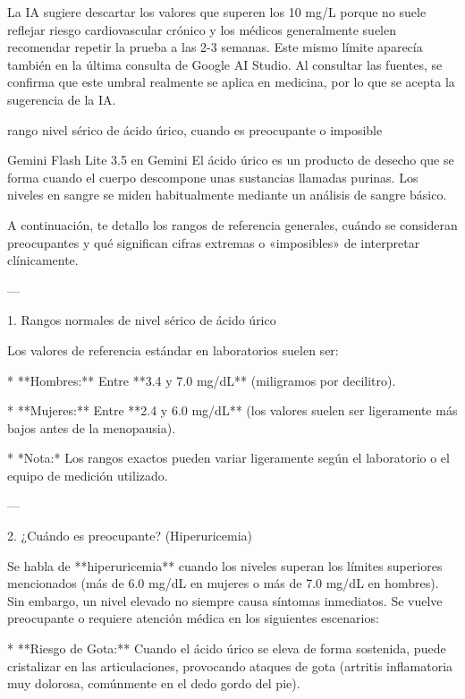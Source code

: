 \documentclass[12pt,a4paper,oneside]{book}
\begin{document}
\begin{iaanalisis}
La IA sugiere descartar los valores que superen los 10 mg/L porque no suele reflejar riesgo cardiovascular crónico y los médicos generalmente suelen recomendar repetir la prueba a las 2-3 semanas. Este mismo límite aparecía también en la última consulta de Google AI Studio. Al consultar las fuentes, se confirma que este umbral realmente se aplica en medicina, por lo que se acepta la sugerencia de la IA.
\end{iaanalisis}




\begin{iaprompt}
rango nivel sérico de ácido úrico, cuando es preocupante o imposible
\end{iaprompt}
\begin{iaresp}{Gemini Flash Lite 3.5 en Gemini}
El ácido úrico es un producto de desecho que se forma cuando el cuerpo descompone unas sustancias llamadas purinas. Los niveles en sangre se miden habitualmente mediante un análisis de sangre básico.

A continuación, te detallo los rangos de referencia generales, cuándo se consideran preocupantes y qué significan cifras extremas o «imposibles» de interpretar clínicamente.

---

1. Rangos normales de nivel sérico de ácido úrico

Los valores de referencia estándar en laboratorios suelen ser:

* **Hombres:** Entre **3.4 y 7.0 mg/dL** (miligramos por decilitro).

* **Mujeres:** Entre **2.4 y 6.0 mg/dL** (los valores suelen ser ligeramente más bajos antes de la menopausia).

* *Nota:* Los rangos exactos pueden variar ligeramente según el laboratorio o el equipo de medición utilizado.

---

2. ¿Cuándo es preocupante? (Hiperuricemia)

Se habla de **hiperuricemia** cuando los niveles superan los límites superiores mencionados (más de 6.0 mg/dL en mujeres o más de 7.0 mg/dL en hombres). Sin embargo, un nivel elevado no siempre causa síntomas inmediatos. Se vuelve preocupante o requiere atención médica en los siguientes escenarios:

* **Riesgo de Gota:** Cuando el ácido úrico se eleva de forma sostenida, puede cristalizar en las articulaciones, provocando ataques de gota (artritis inflamatoria muy dolorosa, comúnmente en el dedo gordo del pie).


\end{iaresp}
\end{document}
